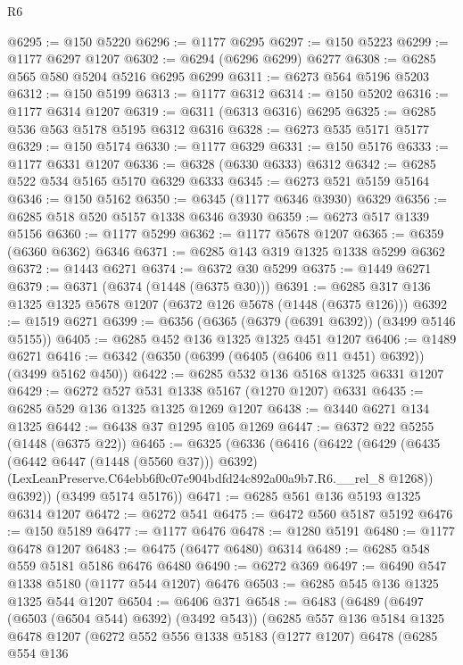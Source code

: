 \begin{lexlean}{R6}
\begin{coremodule}
@6295 := @150 @5220
@6296 := @1177 @6295
@6297 := @150 @5223
@6299 := @1177 @6297 @1207
@6302 := @6294 (@6296 @6299) @6277
@6308 := @6285 @565 @580 @5204 @5216 @6295 @6299
@6311 := @6273 @564 @5196 @5203
@6312 := @150 @5199
@6313 := @1177 @6312
@6314 := @150 @5202
@6316 := @1177 @6314 @1207
@6319 := @6311 (@6313 @6316) @6295
@6325 := @6285 @536 @563 @5178 @5195 @6312 @6316
@6328 := @6273 @535 @5171 @5177
@6329 := @150 @5174
@6330 := @1177 @6329
@6331 := @150 @5176
@6333 := @1177 @6331 @1207
@6336 := @6328 (@6330 @6333) @6312
@6342 := @6285 @522 @534 @5165 @5170 @6329 @6333
@6345 := @6273 @521 @5159 @5164
@6346 := @150 @5162
@6350 := @6345 (@1177 @6346 @3930) @6329
@6356 := @6285 @518 @520 @5157 @1338 @6346 @3930
@6359 := @6273 @517 @1339 @5156
@6360 := @1177 @5299
@6362 := @1177 @5678 @1207
@6365 := @6359 (@6360 @6362) @6346
@6371 := @6285 @143 @319 @1325 @1338 @5299 @6362
@6372 := @1443 @6271
@6374 := @6372 @30 @5299
@6375 := @1449 @6271
@6379 := @6371 (@6374 (@1448 (@6375 @30)))
@6391 := @6285 @317 @136 @1325 @1325 @5678 @1207 (@6372 @126 @5678 (@1448 (@6375 @126)))
@6392 := @1519 @6271
@6399 := @6356 (@6365 (@6379 (@6391 @6392)) (@3499 @5146 @5155))
@6405 := @6285 @452 @136 @1325 @1325 @451 @1207
@6406 := @1489 @6271
@6416 := @6342 (@6350 (@6399 (@6405 (@6406 @11 @451) @6392)) (@3499 @5162 @450))
@6422 := @6285 @532 @136 @5168 @1325 @6331 @1207
@6429 := @6272 @527 @531 @1338 @5167 (@1270 @1207) @6331
@6435 := @6285 @529 @136 @1325 @1325 @1269 @1207
@6438 := @3440 @6271 @134 @1325
@6442 := @6438 @37 @1295 @105 @1269
@6447 := @6372 @22 @5255 (@1448 (@6375 @22))
@6465 := @6325
    (@6336
      (@6416
        (@6422
          (@6429
            (@6435 (@6442 @6447 (@1448 (@5560 @37))) @6392)
            (LexLeanPreserve.C64ebb6f0c07e904bdfd24c892a00a9b7.R6.__rel_8 @1268))
          @6392))
      (@3499 @5174 @5176))
@6471 := @6285 @561 @136 @5193 @1325 @6314 @1207
@6472 := @6272 @541
@6475 := @6472 @560 @5187 @5192
@6476 := @150 @5189
@6477 := @1177 @6476
@6478 := @1280 @5191
@6480 := @1177 @6478 @1207
@6483 := @6475 (@6477 @6480) @6314
@6489 := @6285 @548 @559 @5181 @5186 @6476 @6480
@6490 := @6272 @369
@6497 := @6490 @547 @1338 @5180 (@1177 @544 @1207) @6476
@6503 := @6285 @545 @136 @1325 @1325 @544 @1207
@6504 := @6406 @371
@6548 := @6483
    (@6489
      (@6497 (@6503 (@6504 @544) @6392) (@3492 @543))
      (@6285
        @557
        @136
        @5184
        @1325
        @6478
        @1207
        (@6272
          @552
          @556
          @1338
          @5183
          (@1277 @1207)
          @6478
          (@6285
            @554
            @136

\end{coremodule}
\end{lexlean}
